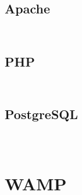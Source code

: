 \begin{lstlisting}[language=bash]

\end{lstlisting}


\section{Apache}


\begin{lstlisting}[language=bash]

\end{lstlisting}





\begin{lstlisting}[language=bash]

\end{lstlisting}

\section{PHP}


\begin{lstlisting}[language=bash]

\end{lstlisting}




\begin{lstlisting}[language=bash]

\end{lstlisting}


\section{PostgreSQL}


\begin{lstlisting}[language=bash]

\end{lstlisting}




\begin{lstlisting}[language=bash]

\end{lstlisting}




\begin{lstlisting}[language=bash]

\end{lstlisting}


\chapter{WAMP}



